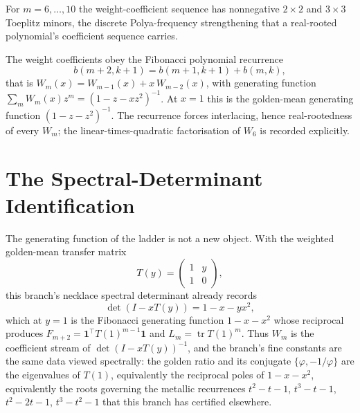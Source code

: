 \begin{theorem}
\label{thm:window6-weight-toeplitz}
For $m=6,\ldots,10$ the weight-coefficient sequence has nonnegative $2\times2$ and $3\times3$ Toeplitz minors, the discrete Polya-frequency strengthening that a real-rooted polynomial's coefficient sequence carries.
\end{theorem}

\begin{theorem}
\label{thm:window6-weight-fibonacci-recurrence}
The weight coefficients obey the Fibonacci polynomial recurrence
$$
b(m+2,k+1)=b(m+1,k+1)+b(m,k),
$$
that is $W_m(x)=W_{m-1}(x)+x\,W_{m-2}(x)$, with generating function $\sum_m W_m(x)z^m=(1-z-xz^2)^{-1}$. At $x=1$ this is the golden-mean generating function $(1-z-z^2)^{-1}$. The recurrence forces interlacing, hence real-rootedness of every $W_m$; the linear-times-quadratic factorisation of $W_6$ is recorded explicitly.
\end{theorem}

\section{The Spectral-Determinant Identification}
\label{sec:window6-weight-spectral-identification}

The generating function of the ladder is not a new object. With the weighted golden-mean transfer matrix
$$
T(y)=\begin{pmatrix}1&y\\1&0\end{pmatrix},
$$
this branch's necklace spectral determinant already records
$$
\det\!\left(I-xT(y)\right)=1-x-yx^2,
$$
which at $y=1$ is the Fibonacci generating function $1-x-x^2$ whose reciprocal produces $F_{m+2}=\mathbf 1^{\top}T(1)^{m-1}\mathbf 1$ and $L_m=\operatorname{tr}T(1)^m$. Thus $W_m$ is the coefficient stream of $\det(I-xT(y))^{-1}$, and the branch's fine constants are the same data viewed spectrally: the golden ratio and its conjugate $\{\varphi,-1/\varphi\}$ are the eigenvalues of $T(1)$, equivalently the reciprocal poles of $1-x-x^2$, equivalently the roots governing the metallic recurrences $t^2-t-1$, $t^3-t-1$, $t^2-2t-1$, $t^3-t^2-1$ that this branch has certified elsewhere.

